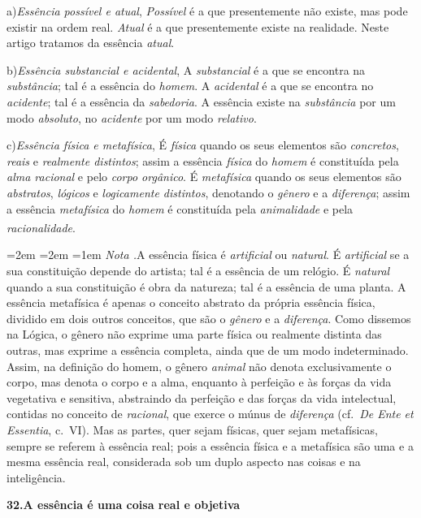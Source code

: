 \documentclass[12pt,a4paper]{article}
\newcommand{\teseB}[2]{\bigskip\noindent\textbf{#1.\quad #2}\par}
\newcommand{\sub}[2]{\medskip\noindent#1)\quad\emph{#2},\;\textemdash\;}
\renewcommand\footnote[1]{%
    \stepcounter{footnote}\textsuperscript{\thefootnote}%
    \par
    {\footnotesize
     \leftskip=2em \rightskip=2em \parindent=1em
     \addvspace{\medskipamount}%
     \noindent\textit{Nota \thefootnote.}\enspace #1\par
     \addvspace{\medskipamount}}%
  }
\begin{document}
\sub{a}{Essência possível e atual} \emph{Possível} é a que presentemente não
existe, mas pode existir na ordem real. \textemdash{} \emph{Atual} é a que
presentemente existe na realidade. \textemdash{} Neste artigo tratamos da
essência \emph{atual}.

\sub{b}{Essência substancial e acidental} A \emph{substancial} é a que se
encontra na \emph{substância}; tal é a essência do \emph{homem}. \textemdash{} A
\emph{acidental} é a que se encontra no \emph{acidente}; tal é a essência da
\emph{sabedoria}. \textemdash{} A essência existe na \emph{substância} por um
modo \emph{absoluto}, no \emph{acidente} por um modo \emph{relativo}.

\sub{c}{Essência física e metafísica} É \emph{física} quando os seus elementos
são \emph{concretos}, \emph{reais} e \emph{realmente distintos}; assim a
essência \emph{física} do \emph{homem} é constituída pela \emph{alma racional} e
pelo \emph{corpo orgânico}. \textemdash{} É \emph{metafísica} quando os seus
elementos são \emph{abstratos}, \emph{lógicos} e \emph{logicamente distintos},
denotando o \emph{gênero} e a \emph{diferença}; assim a essência
\emph{metafísica} do \emph{homem} é constituída pela \emph{animalidade} e pela
\emph{racionalidade}.\footnote{A essência física é \emph{artificial} ou
\emph{natural}. É \emph{artificial} se a sua constituição depende do artista;
tal é a essência de um relógio. É \emph{natural} quando a sua constituição é
obra da natureza; tal é a essência de uma planta. \textemdash{} A essência
metafísica é apenas o conceito abstrato da própria essência física, dividido em
dois outros conceitos, que são o \emph{gênero} e a \emph{diferença}. Como
dissemos na Lógica, o gênero não exprime uma parte física ou realmente distinta
das outras, mas exprime a essência completa, ainda que de um modo
indeterminado. Assim, na definição do homem, o gênero \emph{animal} não denota
exclusivamente o corpo, mas denota o corpo e a alma, enquanto à perfeição e às
forças da vida vegetativa e sensitiva, abstraindo da perfeição e das forças da
vida intelectual, contidas no conceito de \emph{racional}, que exerce o múnus de
\emph{diferença} (cf.\ \emph{De Ente et Essentia}, c.~VI). \textemdash{} Mas as
partes, quer sejam físicas, quer sejam metafísicas, sempre se referem à
essência real; pois a essência física e a metafísica são uma e a mesma essência
real, considerada sob um duplo aspecto \textemdash{} nas coisas e na
inteligência.}

\teseB{32}{A essência é uma coisa real e objetiva}
\end{document}
